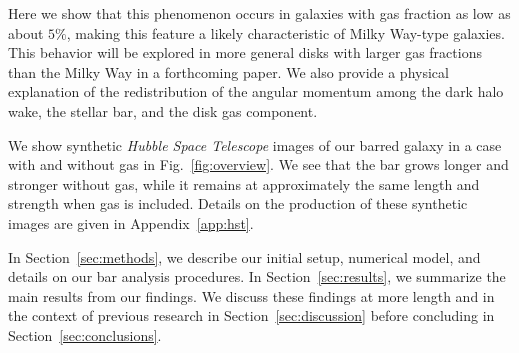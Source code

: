 \documentclass[twocolumn,linenumbers]{aastex631}
\newcommand{\RCR}{\ensuremath{R_{\textrm{CR}}}}
\newcommand{\Rot}{\ensuremath{\mathcal{R}}}
\begin{document}
Here we show that this phenomenon occurs in galaxies with gas fraction
as low as about $5\%$, making this feature a likely characteristic of  Milky
Way-type galaxies. This behavior will be explored in more general disks with
larger gas fractions than the Milky Way in a forthcoming paper.
We also provide a physical explanation of the redistribution of the angular
momentum among the dark halo wake, the stellar bar, and the disk gas component. 


We show synthetic \textit{Hubble Space Telescope} images of our barred galaxy in
a case with and without gas in Fig.~\ref{fig:overview}. We see that the bar
grows longer and stronger without gas, while it remains at approximately the
same length and strength when gas is included. Details on the production of
these synthetic images are given in Appendix~\ref{app:hst}.


In Section~\ref{sec:methods}, we describe our initial setup, numerical model,
and details on our bar analysis procedures. In Section~\ref{sec:results}, we
summarize the main results from our findings. We discuss these findings at more
length and in the context of previous research in Section~\ref{sec:discussion}
before concluding in Section~\ref{sec:conclusions}.

\end{document}
